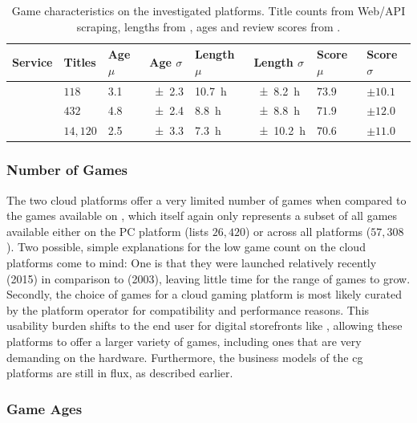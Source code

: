 \begin{table}
\centering
\caption{Game characteristics on the investigated platforms. Title counts from Web/API scraping, lengths from \hltb, ages and review scores from \metacritic.}
\label{tab:game-stats}
	\begin{tabu}{X[2]|X[r]X[r]X[r]X[r]X[r]X[r]X[r]}
	\toprule
	Service & Titles & Age $\mu$ & Age $\sigma$ & Length $\mu$ & Length $\sigma$ & Score $\mu$ & Score $\sigma$ \\
	\midrule
	\gfnow & $118$ & \SI{3.1}{\year} & \SI{\pm2.3}{\year} & \SI{10.7}{\hour} & \SI{\pm8.2}{\hour} & $73.9$ & $\pm10.1$ \\
	\psnow & $432$ & \SI{4.8}{\year} & \SI{\pm2.4}{\year} & \SI{8.8}{\hour} & \SI{\pm8.8}{\hour} & $71.9$ & $\pm12.0$ \\
	\steam & $14,120$ & \SI{2.5}{\year} & \SI{\pm3.3}{\year} & \SI{7.3}{\hour} & \SI{\pm10.2}{\hour} & $70.6$ & $\pm11.0$ \\
	\bottomrule
	\end{tabu}
\end{table}


\subsubsection{Number of Games}

The two cloud
platforms offer a very limited number of games when compared to the
games available on \steam, which itself again only represents a subset
of all games available either on the PC platform (\metacritic lists
$26,420$) or across all platforms ($57,308$). Two
possible, simple explanations for the low game count on the cloud
platforms come to mind: One is that they were launched relatively
recently (2015) in comparison to \steam (2003), leaving little time for
the range of games to grow. Secondly, the choice of games for a cloud
gaming platform is most likely curated by the platform operator for
compatibility and performance reasons. This usability burden shifts to
the end user for digital storefronts like \steam, allowing these
platforms to offer a larger variety of games, including ones that are
very demanding on the hardware. Furthermore, the business models
of the \gls{cg} platforms are still in flux, as described earlier.


\subsubsection{Game Ages}

